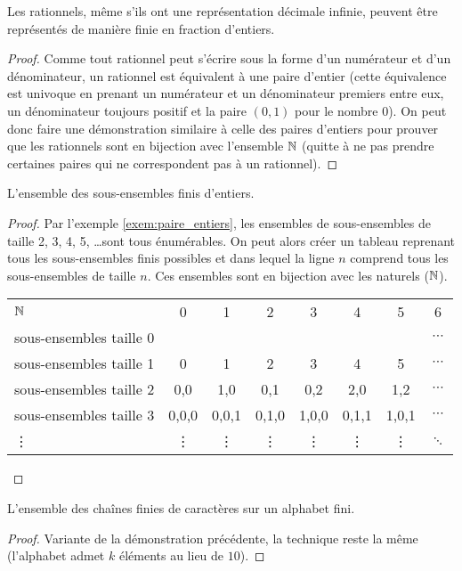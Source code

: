 \begin{myexem}
 Les rationnels, même s'ils ont une représentation décimale infinie, peuvent être représentés de manière finie en fraction d'entiers.
	 \begin{proof}
	 	 Comme tout rationnel peut s'écrire sous la forme d'un numérateur et d'un dénominateur, un rationnel est équivalent à une paire d'entier (cette équivalence est univoque en prenant un numérateur et un dénominateur premiers entre eux, un dénominateur toujours positif et la paire $(0,1)$ pour le nombre $0$). On peut donc faire une démonstration similaire à celle des paires d'entiers pour prouver que les rationnels sont en bijection avec l'ensemble $\mathbb{N}$ (quitte à ne pas prendre certaines paires qui ne correspondent pas à un rationnel).
	 \end{proof}
 \end{myexem}

\begin{myexem}
  L'ensemble des sous-ensembles finis d'entiers.
  \begin{proof}
  Par l'exemple \ref{exem:paire_entiers}, les ensembles de sous-ensembles de taille 2, 3, 4, 5, \dots sont tous énumérables. On peut alors créer un tableau reprenant tous les sous-ensembles finis possibles et dans lequel la ligne $n$ comprend tous les sous-ensembles de taille $n$. Ces ensembles sont en bijection avec les naturels ($\mathbb{N}$).

    \begin{tabular}{ l c c  c  c c c  c }
 	 $\mathbb{N}$ & 0 & 1 & 2  & 3 & 4 & 5 & 6  \\
 	 sous-ensembles  taille 0  & {} & {} & {} & {} & {} & {}  & $\cdots$ \\
 	 sous-ensembles  taille 1  & {0} & {1} & {2} & {3} & {4} & {5} & $\cdots$ \\
 	 sous-ensembles  taille 2  & {0,0} & {1,0} & {0,1} & {0,2} & {2,0} & {1,2}  & $\cdots$ \\
 	 sous-ensembles  taille 3  & {0,0,0} & {0,0,1} & {0,1,0} & {1,0,0} & {0,1,1} & {1,0,1}  & $\cdots$ \\
 	 \vdots  & {\vdots} & {\vdots} & {\vdots} & {\vdots} & {\vdots} & {\vdots}  & $\ddots$ \\
	\end{tabular}
  \end{proof}
\end{myexem}

\begin{myexem}
\label{exem:chaines_finies}
  L'ensemble des chaînes finies de caractères sur un alphabet fini.
\begin{proof}
 Variante de la démonstration précédente, la technique reste la même (l'alphabet admet $k$ éléments au lieu de $10$).
\end{proof}
\end{myexem}

